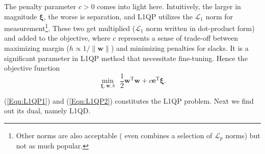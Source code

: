 \documentclass[11pt,a4paper]{article}
\theoremstyle{definition}
\renewcommand{\vec}[1]{\boldsymbol{#1}}
\begin{document}
      The penalty parameter $c>0$ comes into light here. Intuitively, the larger in magnitude $\vec{\xi}$, the worse is separation, and L1QP utilizes the $\mathcal{L}_{1}$ norm for measurement\footnote{Other norms are also acceptable (\cite{neumann2005combined} even combines a selection of $\mathcal{L}_{p}$ norms) but not as much popular.}. These two get multiplied ($\mathcal{L}_{1}$ norm written in dot-product form) and added to the objective, where $c$ represents a sense of trade-off between maximizing margin ($h\propto 1/\|\vec{w}\|$) and minimizing penalties for slacks. It is a significant parameter in L1QP method that necessitate fine-tuning. Hence the objective function
      \begin{equation}
        \min_{\vec{\xi},\vec{w},b}~~ \dfrac{1}{2}\vec{w}^{\mathrm{T}}\vec{w}+c\vec{e}^{\mathrm{T}}\vec{\xi}. \label{Eqn:L1QP1}
      \end{equation}

      (\ref{Eqn:L1QP1}) and (\ref{Eqn:L1QP2}) constitutes the L1QP problem. Next we find out its dual, namely L1QD.
\end{document}
